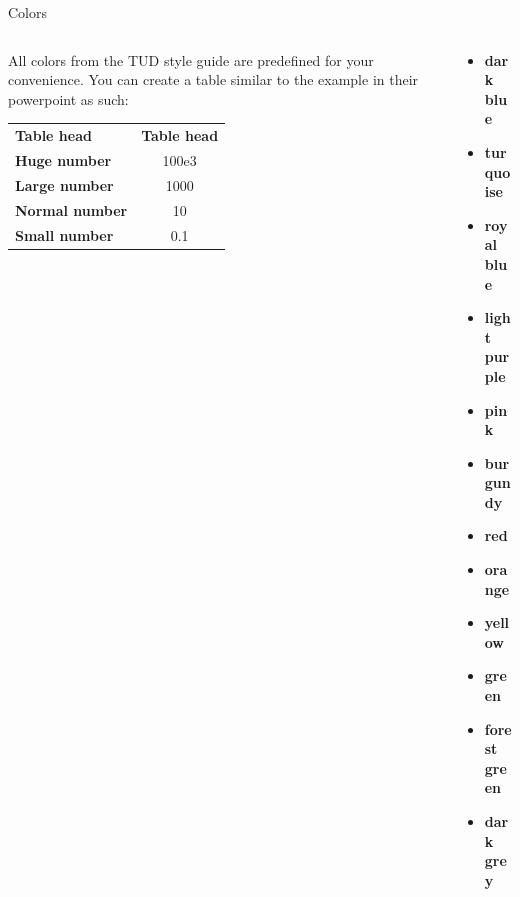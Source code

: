\begin{frame}[t]{Colors}
  \begin{columns}[T, onlytextwidth]
    \begin{column}{0.5\textwidth}
      All colors from the TUD style guide are predefined for your convenience.
      You can create a table similar to the example in their powerpoint as such:\\[1ex]
      
      \renewcommand{\arraystretch}{1.4}
      \newcommand{\thead}{\color{white}\bfseries} %
      \begin{tabular}{>{\color{tud Blue}\bfseries}l|S}
        \thead Table head & {\thead Table head} \\
        Huge number & 100e3 \\
        Large number & 1000\\
        Normal number & 10\\
        Small number & 0.1\\
      \end{tabular}
    \end{column}
    \begin{column}{0.25\textwidth}
      \begin{itemize}
        \item \textcolor{tud DarkBlue}{\textbf{dark blue}}
        \item \textcolor{tud Turquoise}{\textbf{turquoise}}
        \item \textcolor{tud RoyalBlue}{\textbf{royal blue}}
        \item \textcolor{tud LightPurple}{\textbf{light purple}}
        \item \textcolor{tud Pink}{\textbf{pink}}
        \item \textcolor{tud Burgundy}{\textbf{burgundy}}
        \item \textcolor{tud Red}{\textbf{red}}
        \item \textcolor{tud Orange}{\textbf{orange}}
        \item \textcolor{tud Yellow}{\textbf{yellow}}
        \item \textcolor{tud Green}{\textbf{green}}
        \item \textcolor{tud ForestGreen}{\textbf{forest green}}
        \item \textcolor{tud DarkGrey}{\textbf{dark grey}}
      \end{itemize}
    \end{column}

\end{columns}
\end{frame}
